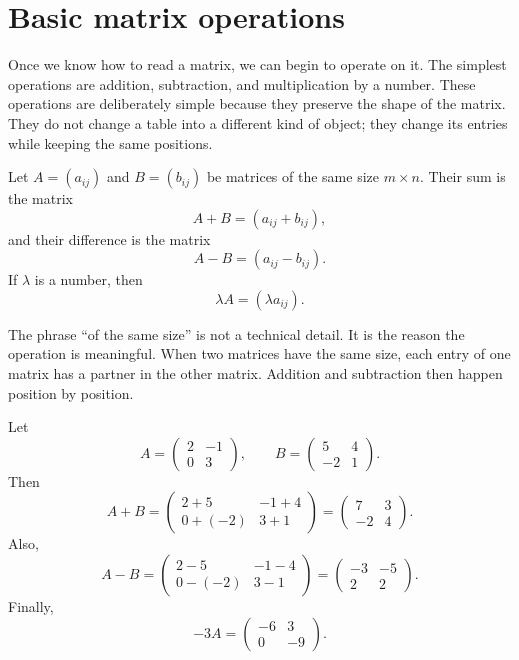 \section{Basic matrix operations}

Once we know how to read a matrix, we can begin to operate on it. The simplest operations are addition, subtraction, and multiplication by a number. These operations are deliberately simple because they preserve the shape of the matrix. They do not change a table into a different kind of object; they change its entries while keeping the same positions.

\begin{definitionbox}
Let \(A=(a_{ij})\) and \(B=(b_{ij})\) be matrices of the same size \(m\times n\). Their sum is the matrix
\[
A+B=(a_{ij}+b_{ij}),
\]
and their difference is the matrix
\[
A-B=(a_{ij}-b_{ij}).
\]
If \(\lambda\) is a number, then
\[
\lambda A=(\lambda a_{ij}).
\]
\end{definitionbox}

The phrase ``of the same size'' is not a technical detail. It is the reason the operation is meaningful. When two matrices have the same size, each entry of one matrix has a partner in the other matrix. Addition and subtraction then happen position by position.

\begin{examplebox}
Let
\[
A=\begin{pmatrix}2 & -1\\ 0 & 3\end{pmatrix},
\qquad
B=\begin{pmatrix}5 & 4\\ -2 & 1\end{pmatrix}.
\]
Then
\[
A+B=
\begin{pmatrix}
2+5 & -1+4\\
0+(-2) & 3+1
\end{pmatrix}
=
\begin{pmatrix}
7 & 3\\
-2 & 4
\end{pmatrix}.
\]
Also,
\[
A-B=
\begin{pmatrix}
2-5 & -1-4\\
0-(-2) & 3-1
\end{pmatrix}
=
\begin{pmatrix}
-3 & -5\\
2 & 2
\end{pmatrix}.
\]
Finally,
\[
-3A=
\begin{pmatrix}
-6 & 3\\
0 & -9
\end{pmatrix}.
\]
\end{examplebox}

